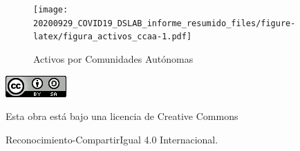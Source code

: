 \documentclass[
  11pt,
]{article}
\begin{document}
\begin{figure}
\centering
\texttt{[image: 20200929\_COVID19\_DSLAB\_informe\_resumido\_files/figure-latex/figura\_activos\_ccaa-1.pdf]}
\caption{\label{fig:figura_activos_ccaa} Activos por Comunidades
Autónomas}
\end{figure}

\begin{center}
\includegraphics{cc.png}
\end{center}

\vspace{0.2cm}

\begin{center}
Esta obra está bajo una licencia de Creative Commons 
\end{center}

\begin{center}
Reconocimiento-CompartirIgual 4.0 Internacional.
\end{center}
\end{document}
